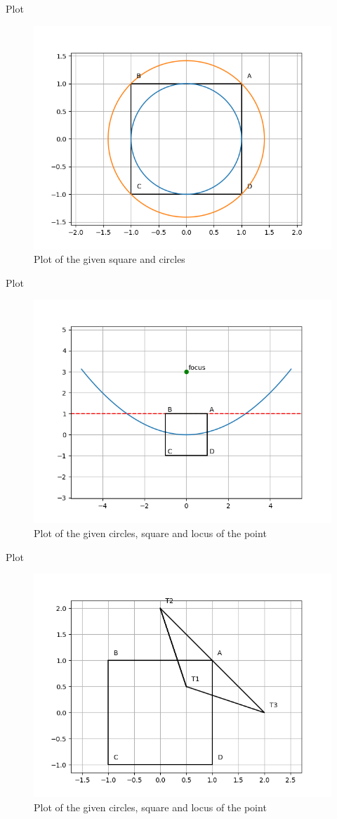 \documentclass{beamer}
\begin{document}
\begin{frame}{Plot}
    \begin{figure}
        \centering
        \includegraphics[width=0.5\columnwidth]{../figs/plot1.png}
        \caption{Plot of the given square and circles}
        \label{fig:fig}
    \end{figure}
\end{frame}

\begin{frame}{Plot}
    \begin{figure}
        \centering
        \includegraphics[width=0.5\columnwidth]{../figs/plot2.png}
        \caption{Plot of the given circles, square and locus of the point }
        \label{fig:fig}
    \end{figure}
\end{frame}

\begin{frame}{Plot}
    \begin{figure}
        \centering
        \includegraphics[width=0.5\columnwidth]{../figs/plot3.png}
        \caption{Plot of the given circles, square and locus of the point }
        \label{fig:fig}
    \end{figure}
\end{frame}
\end{document}
